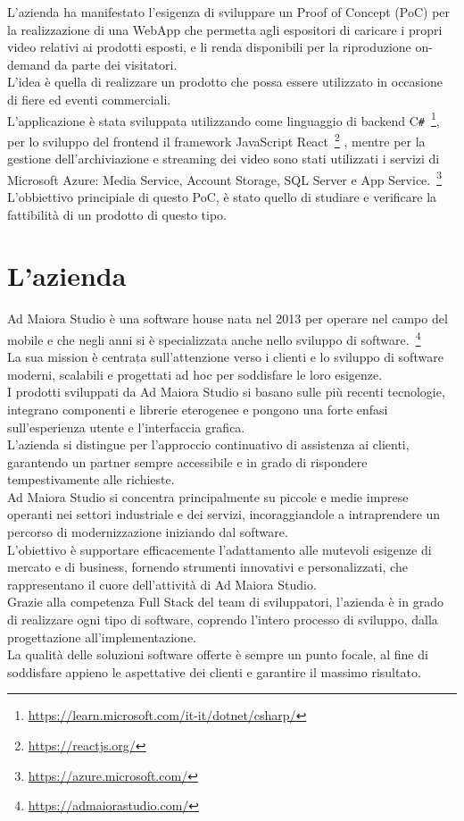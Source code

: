 L'azienda ha manifestato l'esigenza di sviluppare un Proof of Concept (PoC) per la realizzazione di una WebApp che permetta agli espositori di caricare i propri video relativi ai prodotti esposti, e li renda disponibili per la riproduzione on-demand da parte dei visitatori.\\
L'idea è quella di realizzare un prodotto che possa essere utilizzato in occasione di fiere ed eventi commerciali.\\
L'applicazione è stata sviluppata utilizzando come linguaggio di backend C\texttt{\#}~\footnote{\url{https://learn.microsoft.com/it-it/dotnet/csharp/}}, per lo sviluppo del frontend il framework JavaScript React~\footnote{\url{https://reactjs.org/}}  ,
mentre per la gestione dell'archiviazione e streaming dei video sono stati utilizzati i servizi di Microsoft Azure: Media Service, Account Storage, SQL Server e App Service.~\footnote{\url{https://azure.microsoft.com/}}\\
L'obbiettivo principiale di questo PoC, è stato quello di studiare e verificare la fattibilità di un prodotto di questo tipo.\\
\section{L'azienda}

Ad Maiora Studio è una software house nata nel 2013 per operare nel campo del mobile e che negli anni si è specializzata anche nello sviluppo di software.~\footnote{\url{https://admaiorastudio.com/}}\\
La sua mission è centrata sull'attenzione verso i clienti e lo sviluppo di software moderni, scalabili e progettati ad hoc per soddisfare le loro esigenze. \\
I prodotti sviluppati da Ad Maiora Studio si basano sulle più recenti tecnologie, integrano componenti e librerie eterogenee e pongono una forte enfasi sull'esperienza utente
 e l'interfaccia grafica.\\
L'azienda si distingue per l'approccio continuativo di assistenza ai clienti, 
garantendo un partner sempre accessibile e in grado di rispondere tempestivamente alle richieste. \\
Ad Maiora Studio si concentra principalmente su piccole e medie imprese operanti nei settori industriale e dei servizi, incoraggiandole a intraprendere un percorso di modernizzazione
 iniziando dal software.\\
L'obiettivo è supportare efficacemente l'adattamento alle mutevoli esigenze di mercato e di business, fornendo strumenti innovativi e personalizzati, che rappresentano il cuore dell'attività di Ad Maiora Studio.\\
Grazie alla competenza Full Stack del team di sviluppatori, l'azienda è in grado di realizzare ogni tipo di software, 
coprendo l'intero processo di sviluppo, dalla progettazione all'implementazione.\\
La qualità delle soluzioni software offerte è sempre un punto focale, al fine di soddisfare appieno le aspettative dei clienti e garantire il massimo risultato.



